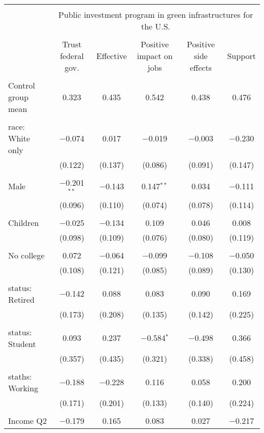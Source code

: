 
\begin{tabular}{@{\extracolsep{5pt}}lccccc} 
\\[-1.8ex]\hline 
\hline \\[-1.8ex] 
 & \multicolumn{5}{c}{Public investment program in green infrastructures for the U.S.} \\ 
\cline{2-6} 
\\[-1.8ex] & Trust federal gov. & Effective & Positive impact on jobs & Positive side effects & Support \\ 
\hline \\[-1.8ex] 
 Control group mean & 0.323 & 0.435 & 0.542 & 0.438 & 0.476  \\ \hline \\[-1.8ex] race: White only & $-$0.074 & 0.017 & $-$0.019 & $-$0.003 & $-$0.230 \\ 
  & (0.122) & (0.137) & (0.086) & (0.091) & (0.147) \\ 
  & & & & & \\ 
 Male & $-$0.201$^{**}$ & $-$0.143 & 0.147$^{**}$ & 0.034 & $-$0.111 \\ 
  & (0.096) & (0.110) & (0.074) & (0.078) & (0.114) \\ 
  & & & & & \\ 
 Children & $-$0.025 & $-$0.134 & 0.109 & 0.046 & 0.008 \\ 
  & (0.098) & (0.109) & (0.076) & (0.080) & (0.119) \\ 
  & & & & & \\ 
 No college & 0.072 & $-$0.064 & $-$0.099 & $-$0.108 & $-$0.050 \\ 
  & (0.108) & (0.121) & (0.085) & (0.089) & (0.130) \\ 
  & & & & & \\ 
 status: Retired & $-$0.142 & 0.088 & 0.083 & 0.090 & 0.169 \\ 
  & (0.173) & (0.208) & (0.135) & (0.142) & (0.225) \\ 
  & & & & & \\ 
 status: Student & 0.093 & 0.237 & $-$0.584$^{*}$ & $-$0.498 & 0.366 \\ 
  & (0.357) & (0.435) & (0.321) & (0.338) & (0.458) \\ 
  & & & & & \\ 
 staths: Working & $-$0.188 & $-$0.228 & 0.116 & 0.058 & 0.200 \\ 
  & (0.171) & (0.201) & (0.133) & (0.140) & (0.224) \\ 
  & & & & & \\ 
 Income Q2 & $-$0.179 & 0.165 & 0.083 & 0.027 & $-$0.217 \\ 

\end{tabular}
